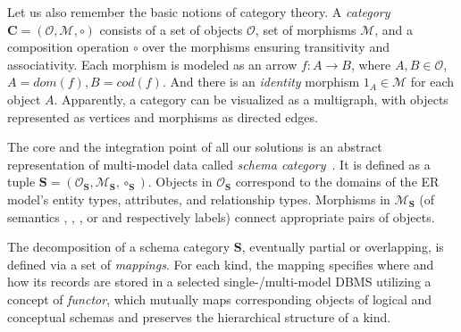 Let us also remember the basic notions of category theory.
A \textit{category} $\mathbf{C} = (\mathcal{O}, \mathcal{M}, \circ)$ consists of a set of objects $\mathcal{O}$, set of morphisms $\mathcal{M}$, and a composition operation $\circ$ over the morphisms ensuring transitivity and associativity. Each morphism is modeled as an arrow $f : A \rightarrow B$, where $A, B \in \mathcal{O}$, $A = dom(f), B = cod(f)$. And there is an \textit{identity} morphism $1_A \in \mathcal{M}$ for each object $A$. Apparently, a category can be visualized as a multigraph, with objects represented as vertices and morphisms as directed edges.

The core and the integration point of all our solutions is an abstract representation of multi-model data called \textit{schema category}~\citep{mm_cat_journal}. It is defined as a tuple $\mathbf{S} = (\mathcal{O}_\mathbf{S}, \mathcal{M}_\mathbf{S}, \circ_\mathbf{S})$. Objects in $\mathcal{O}_\mathbf{S}$ correspond to the domains of the ER model's entity types, attributes, and relationship types. Morphisms in $\mathcal{M}_\mathbf{S}$ (of semantics , , , or  and respectively labels) connect appropriate pairs of objects. %


The decomposition of a schema category $\mathbf{S}$, eventually partial or overlapping, is defined via a set of \textit{mappings}. For each kind, the mapping specifies where and how its records are stored in a selected single-/multi-model DBMS utilizing a concept of \textit{functor}, which mutually maps corresponding objects of logical and conceptual schemas and preserves the hierarchical structure of a kind.%

